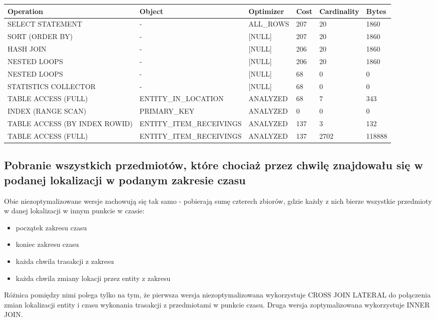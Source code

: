 \documentclass[11pt]{article}
\numberwithin{figure}{subsection}
\begin{document}
		\begin{tabularx}{\textwidth}{|X|X|X|X|X|X|}
Operation&Object&Optimizer&Cost&Cardinality&Bytes\\ \hline
SELECT STATEMENT& - &ALL\_ROWS&207&20&1860\\ \hline
SORT (ORDER BY)& - &[NULL]&207&20&1860\\ \hline
HASH JOIN& - &[NULL]&206&20&1860\\ \hline
NESTED LOOPS& - &[NULL]&206&20&1860\\ \hline
NESTED LOOPS& - &[NULL]&68&0&0\\ \hline
STATISTICS COLLECTOR& - &[NULL]&68&0&0\\ \hline
TABLE ACCESS (FULL)&ENTITY\_IN\_LOCATION&ANALYZED&68&7&343\\ \hline
INDEX (RANGE SCAN)&PRIMARY\_KEY&ANALYZED&0&0&0\\ \hline
TABLE ACCESS (BY INDEX ROWID)&ENTITY\_ITEM\_RECEIVINGS&ANALYZED&137&3&132\\ \hline
TABLE ACCESS (FULL)&ENTITY\_ITEM\_RECEIVINGS&ANALYZED&137&2702&118888\\ \hline
		\end{tabularx}
		
		
		
		
		
		
		
		
		
		
		
	
	\subsection{Pobranie wszystkich przedmiotów, które chociaż przez chwilę
	znajdowału się w podanej lokalizacji w podanym zakresie czasu}
			
		Obie niezoptymalizowane wersje zachowują się tak samo - pobierają sumę
		czterech zbiorów, gdzie każdy z nich bierze wszystkie przedmioty w danej
		lokalizacji w innym punkcie w czasie:
		\begin{itemize}
			\item początek zakresu czasu
			\item koniec zakresu czasu
			\item każda chwila trasakcji z zakresu
			\item każda chwila zmiany lokacji przez entity z zakresu
		\end{itemize}
		Różnica pomiędzy nimi polega tylko na tym, że pierwsza wersja
		niezoptymalizowana wykorzystuje CROSS JOIN LATERAL do połączenia zmian
		lokalizacji entity i czasu wykonania trasakcji z przedmiotami w punkcie
		czasu. Druga wersja zoptymalizowana wykorzystuje INNER JOIN.
		
\end{document}
